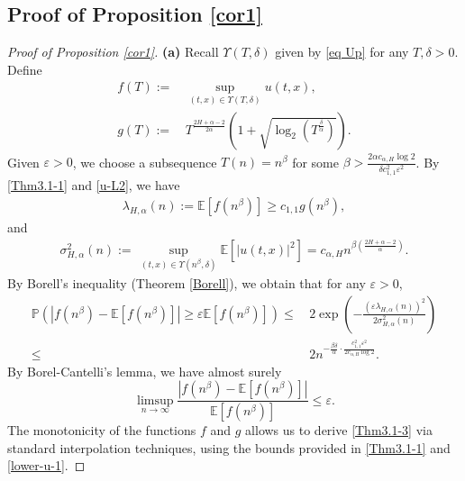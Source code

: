 \documentclass[11pt,reqno]{amsart}
\numberwithin{equation}{section}
\def\EE{\mathbb{E}}
\newcommand\bp{\mathbb{P}}
\newcommand{\1}{{\bf 1}}
\newcommand{\2}{{\bf 2}}
\newcommand{\lc}{\left(}
\newcommand{\rc}{\right)}
\newcommand{\lk}{\left[}
\newcommand{\rk}{\right]}
\begin{document}
\subsection{Proof of Proposition \ref{cor1}}
\begin{proof}[Proof of Proposition \ref{cor1}]
 \noindent\textbf{(a)} Recall   $\Upsilon(T,\delta)$ given by \eqref{eq Up} for any $T, \delta > 0$. Define
\begin{align*}
f(T):=&\, \sup_{(t,x)\in\Upsilon(T,\delta)} u(t,x),\\ 
g(T):= &\, T^{\frac{2H+\alpha-2}{2\alpha}}\left( 1+\sqrt{\log_2\left(  T^{\frac{\delta}{\alpha}} \right)} \right).
\end{align*}
Given $\varepsilon>0$, we choose a subsequence $T(n)=n^{\beta}$ for some
$\beta>\frac{2\alpha c_{\alpha,H}\log 2 }{\delta c_{1,1}^2\varepsilon^2}$.
By \eqref{Thm3.1-1} and \eqref{u-L2}, we have
\begin{align*}
 \lambda_{H,\alpha}(n):=\EE \lk f\left(n^\beta\right)\rk
     \geq c_{1,1}g\left(n^\beta\right),
\end{align*}
    and
\begin{align*}
	\sigma^2_{H,\alpha}(n):= \, \sup_{(t,x)\in\Upsilon\left(n^\beta,\delta\right)}
     \EE\left[|u (t,x)|^2\right]
     = c_{\alpha,H}n^{\beta\lc \frac{2H+\alpha-2}{\alpha}\rc}.
\end{align*}
By Borell's inequality (Theorem \ref{Borell}), we obtain that for any $\varepsilon>0$,
\begin{equation*}
\begin{split}
   \bp \left(  \left|f\left(n^\beta\right)-
   \EE\left[ f\left(n^\beta\right) \right]  \right|
   \geq\varepsilon \EE\left[ f\left(n^\beta\right) \right]  \right)  
\leq  &\,  2  \exp\left( -\frac{\left(\varepsilon\lambda_{H,\alpha}(n)\right)^2}{2\sigma^2_{H,\alpha}(n)}\right) \\
\leq & \, 2 n^{-{ \frac{\beta\delta}{\alpha}\cdot\frac{c_{1,1}^2\varepsilon^2}{2c_{\alpha,H}\log 2}}}.
\end{split}
\end{equation*}
By Borel-Cantelli's lemma,  we have almost surely
\begin{equation}\label{lower-u-1}
\limsup_{n \rightarrow\infty}
\frac {  \left|f\left(n^\beta\right)-\EE\left[ f\left(n^\beta\right) \right]  \right| }
 {\EE\left[f\left(n^\beta\right) \right] }\leq \varepsilon.
	\end{equation}
	The monotonicity of the functions  $f$ and $g$ allows us to derive \eqref{Thm3.1-3} via standard interpolation techniques, using the bounds provided in  \eqref{Thm3.1-1} and \eqref{lower-u-1}.


\end{proof}
\end{document}
